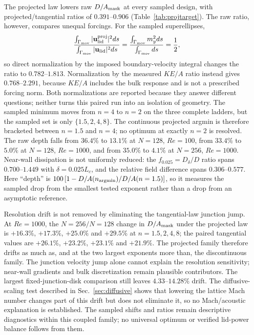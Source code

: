 \documentclass[11pt]{article}
\begin{document}
The projected law lowers raw $D/A_{\rm mask}$ at every sampled design, with
projected/tangential ratios of $0.391$--$0.906$ (Table~\ref{tab:projtarget}).
The raw ratio, however, compares unequal forcings. For the sampled
superellipses,
\[
  \frac{\int_{\Gamma_{\rm mov}}|\mathbf{u}_{\rm lid}^{\rm proj}|^2ds}
       {\int_{\Gamma_{\rm mov}}|\mathbf{u}_{\rm lid}|^2ds}
  =\frac{\int_{\Gamma_{\rm mov}}m_y^2ds}{\int_{\Gamma_{\rm mov}}ds}
  =\frac12 ,
\]
so direct normalization by the imposed boundary-velocity integral changes the
ratio to $0.782$--$1.813$. Normalization by the measured $KE/A$ ratio instead
gives $0.768$--$2.291$, because $KE/A$ includes the bulk response and is not a
prescribed forcing norm. Both normalizations are reported because they answer
different questions; neither turns this paired run into an isolation of
geometry. The sampled minimum moves from $n=4$ to $n=2$ on the three complete
ladders, but the sampled set is only $\{1.5,2,4,8\}$. The continuous projected
argmin is therefore bracketed between $n=1.5$ and $n=4$; no optimum at exactly
$n=2$ is resolved. The raw depth falls from $36.4\%$ to $13.1\%$ at $N=128$,
$Re=100$, from $33.4\%$ to $5.0\%$ at $N=128$, $Re=1000$, and from $35.0\%$ to
$4.1\%$ at $N=256$, $Re=1000$. Near-wall dissipation is not uniformly reduced:
the $f_{0.025}=D_\delta/D$ ratio spans $0.700$--$1.449$ with
$\delta=0.025L_c$, and the relative field difference spans $0.306$--$0.577$.
Here ``depth'' is
$100\,[1-D/A(n_{\rm argmin})/D/A(n=1.5)]$, so it measures the sampled drop
from the smallest tested exponent rather than a drop from an asymptotic
reference.

Resolution drift is not removed by eliminating the tangential-law junction
jump. At $Re=1000$, the $N=256/N=128$ change in $D/A_{\rm mask}$ under the
projected law is $+16.3\%$, $+17.3\%$, $+25.0\%$ and $+29.5\%$ at
$n=1.5,2,4,8$; the paired tangential values are $+26.1\%$, $+23.2\%$,
$+23.1\%$ and $+21.9\%$. The projected family therefore drifts as much as, and
at the two largest exponents more than, the discontinuous family. The junction
velocity jump alone cannot explain the resolution sensitivity; near-wall
gradients and bulk discretization remain plausible contributors. The largest
fixed-junction-disk comparison still leaves $4.33$--$14.28\%$ drift. The
diffusive-scaling test described in Sec.~\ref{sec:diffusive} shows that lowering
the lattice Mach number changes part of this drift but does not eliminate it, so
no Mach/acoustic explanation is established. The sampled shifts and
ratios remain descriptive diagnostics within this coupled family; no universal
optimum or verified lid-power balance follows from them.
\end{document}
